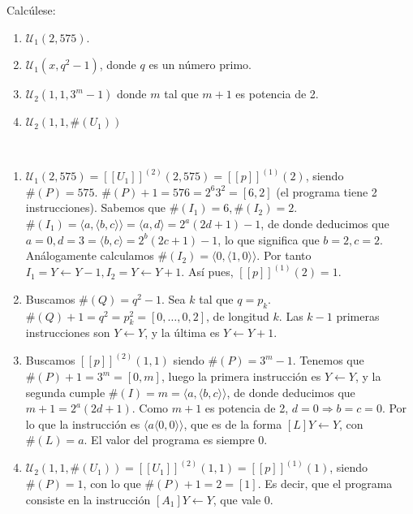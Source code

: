 \documentclass[twoside]{article}
\begin{document}
\begin{ejercicio}{5}
Calcúlese:
\begin{enumerate}
\item $\mathcal{U}_1(2,575)$.
\item $\mathcal{U}_1(x,q^2-1)$, donde $q$ es un número primo.
\item $\mathcal{U}_2(1,1,3^m-1)$ donde $m$ tal que $m+1$ es potencia de 2.
\item $\mathcal{U}_2(1,1,\#(U_1))$ 
\end{enumerate}
\end{ejercicio}
\begin{solucion}\
\begin{enumerate}
\item  $\mathcal{U}_1(2,575)=[[U_1]]^{(2)}(2,575)=[[p]]^{(1)}(2)$, siendo $\#(P)=575$. $\#(P)+1=576=2^6 3^2=[6,2]$ (el programa tiene 2 instrucciones). Sabemos que $\#(I_1)=6,\#(I_2)=2$.$\#(I_1)=\langle a,\langle b,c\rangle\rangle=\langle a,d\rangle=2^a(2d+1)-1$, de donde deducimos que $a=0,d=3=\langle b,c\rangle=2^b(2c+1)-1$, lo que significa que $b=2,c=2$. Análogamente calculamos $\#(I_2)=\langle 0, \langle 1,0\rangle\rangle$. Por tanto $I_1=Y\leftarrow Y-1, I_2=Y\leftarrow Y+1$. Así pues, $[[p]]^{(1)}(2)=1$. 
\item  Buscamos $\#(Q)=q^2-1$. Sea $k$ tal que $q=p_k$. $\#(Q)+1=q^2=p_k^2=[0,\dots,0,2]$, de longitud $k$. Las $k-1$ primeras instrucciones son $Y\leftarrow Y$, y la última es $Y\leftarrow Y+1$. 
\item  Buscamos $[[p]]^{(2)}(1,1)$ siendo $\#(P)=3^m-1$. Tenemos que $\#(P)+1=3^m=[0,m]$, luego la primera instrucción es $Y\leftarrow Y$, y la segunda cumple $\#(I)=m=\langle a,\langle b,c\rangle\rangle$, de donde deducimos que $m+1=2^a(2d+1)$. Como $m+1$ es potencia de 2, $d=0\Rightarrow b=c=0$. Por lo que la instrucción es $\langle a\langle 0,0\rangle\rangle$, que es de la forma $[L] Y\leftarrow Y$, con $\#(L)=a$. El valor del programa es siempre 0.
\item $\mathcal{U}_2(1,1,\#(U_1))=[[U_1]]^{(2)}(1,1)=[[p]]^{(1)}(1)$, siendo $\#(P)=1$, con lo que $\#(P)+1=2=[1]$. Es decir, que el programa consiste en la instrucción $[A_1] Y\leftarrow Y$, que vale 0.
\end{enumerate}
\end{solucion}
\end{document}
